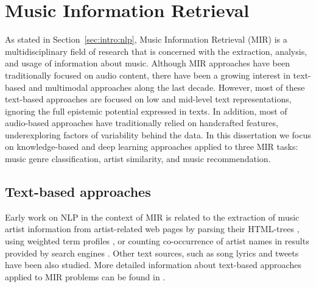\section{Music Information Retrieval}
\label{sec:SOA:mir}

As stated in Section~\ref{sec:intro:nlp}, Music Information Retrieval (MIR) is a multidisciplinary field of research that is concerned with the extraction, analysis, and usage of information about music. %
Although MIR approaches have been traditionally focused on audio content, there have been a growing interest in text-based and multimodal approaches along the last decade. However, most of these text-based approaches are focused on low and mid-level text representations, ignoring the full epistemic potential expressed in texts. In addition, most of audio-based approaches have traditionally relied on handcrafted features, underexploring factors of variability behind the data.
In this dissertation we focus on knowledge-based and deep learning approaches applied to three MIR tasks: music genre classification, artist similarity, and music recommendation.

\subsection{Text-based approaches}

Early work on NLP in the context of MIR is related to the extraction of music artist information from artist-related web pages by parsing their HTML-trees \citep{Cohen2000}, using weighted term profiles \citep{Ellis2002,Whitman2002}, or counting co-occurrence of artist names in results provided by search engines \citep{Schedl2005}. Other text sources, such as song lyrics \citep{laurier2008multimodal,corona2015exploration} and tweets \citep{hauger2013million,schedl2012mining} have been also studied. %
More detailed information about text-based approaches applied to MIR problems can be found in \cite{Knees2013, Schedl2014}.

